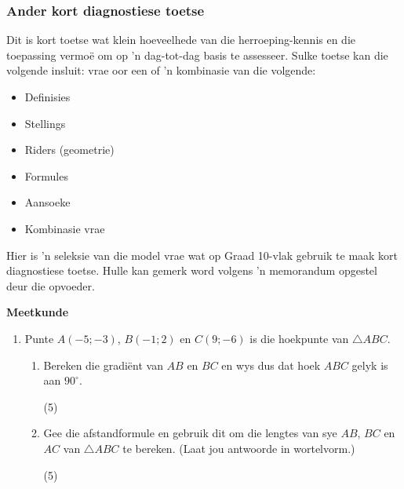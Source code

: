 \subsubsection{Ander kort diagnostiese toetse}
Dit is kort toetse wat klein hoeveelhede van die herroeping-kennis en die toepassing vermoë om op 'n dag-tot-dag basis te assesseer. Sulke toetse kan die volgende insluit: vrae oor een of 'n kombinasie van die volgende:
\begin{itemize}[noitemsep]
\item
  Definisies
\item
  Stellings
\item
  Riders (geometrie)
\item
  Formules
\item
  Aansoeke
\item
  Kombinasie vrae
\end{itemize}
Hier is 'n seleksie van die model vrae wat op Graad 10-vlak gebruik te maak kort diagnostiese toetse. Hulle kan gemerk word volgens 'n memorandum opgestel deur die opvoeder.

\textbf{Meetkunde}
\begin{enumerate}[itemsep=0pt, label=\textbf{\arabic*}. ] 
\item Punte $A(-5; -3)$, $B(-1; 2)$ en $C(9; -6)$ is die hoekpunte van $\triangle ABC$. 
\begin{enumerate}[itemsep=0pt,label=\textbf{(\alph*)}]
\item Bereken die gradiënt van $AB$ en $BC$ en wys dus dat hoek $ABC$ gelyk is aan $90^{\circ}$.				
\begin{flushright}(5)\end{flushright}
\item Gee die afstandformule en gebruik dit om die lengtes van sye
$AB$, $BC$ en $AC$ van $\triangle ABC$ te bereken. (Laat jou antwoorde in wortelvorm.)
\begin{flushright}(5)\end{flushright}
\end{enumerate}
\end{enumerate}

